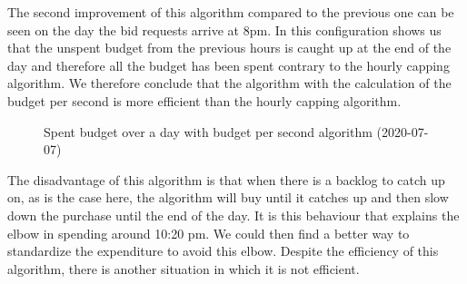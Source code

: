 \documentclass[12pt]{article}
\begin{document}
The second improvement of this algorithm compared to the previous one can be seen on the day the bid requests arrive at 8pm. In this configuration  shows us that the unspent budget from the previous hours is caught up at the end of the day and therefore all the budget has been spent contrary to the hourly capping algorithm. We therefore conclude that the algorithm with the calculation of the budget per second is more efficient than the hourly capping algorithm. \\

\begin{figure}[h!]
	\centering
	\vspace{-.7cm}
	\caption{Spent budget over a day with budget per second algorithm (2020-07-07)}
	\label{good_bt2}
\end{figure}

The disadvantage of this algorithm is that when there is a backlog to catch up on, as is the case here, the algorithm will buy until it catches up and then slow down the purchase until the end of the day. It is this behaviour that explains the elbow in spending around 10:20 pm. We could then find a better way to standardize the expenditure to avoid this elbow. Despite the efficiency of this algorithm, there is another situation in which it is not efficient.
\end{document}
